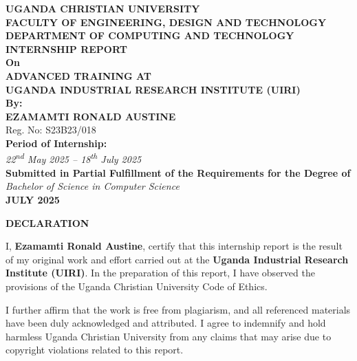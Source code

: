 \documentclass[12pt,a4paper]{report}
\begin{document}

\begin{titlepage}
    \centering
    {\large \textbf{UGANDA CHRISTIAN UNIVERSITY}}\\[1.5cm]
    {\large \textbf{FACULTY OF ENGINEERING, DESIGN AND TECHNOLOGY}}\\[0.5cm]
    {\large \textbf{DEPARTMENT OF COMPUTING AND TECHNOLOGY}}\\[2cm]
    {\LARGE \textbf{INTERNSHIP REPORT}}\\[0.5cm]
    \textbf{On} \\[0.3cm]
    {\Large \textbf{ADVANCED TRAINING AT}}\\[0.3cm]
    {\Large \textbf{UGANDA INDUSTRIAL RESEARCH INSTITUTE (UIRI)}}\\[1.5cm]

    \textbf{By:} \\[0.3cm]
    {\Large \textbf{EZAMAMTI RONALD AUSTINE}}\\
    {\large Reg. No: S23B23/018}\\[2cm]

    \textbf{Period of Internship:} \\[0.2cm]
    \textit{22\textsuperscript{nd} May 2025 – 18\textsuperscript{th} July 2025}\\[2cm]

    \textbf{Submitted in Partial Fulfillment of the Requirements for the Degree of} \\
    \textit{Bachelor of Science in Computer Science}\\[1.5cm]

    \textbf{JULY 2025}
\end{titlepage}

{\fontsize{14}{16.8}\selectfont\bfseries\centering DECLARATION\par}
\vspace{10pt}
\vspace{5pt}
\noindent I, \textbf{Ezamamti Ronald Austine}, certify that this internship report is the result of my original work and effort carried out at the \textbf{Uganda Industrial Research Institute (UIRI)}. In the preparation of this report, I have observed the provisions of the Uganda Christian University Code of Ethics.

\noindent I further affirm that the work is free from plagiarism, and all referenced materials have been duly acknowledged and attributed. I agree to indemnify and hold harmless Uganda Christian University from any claims that may arise due to copyright violations related to this report.
\end{document}
